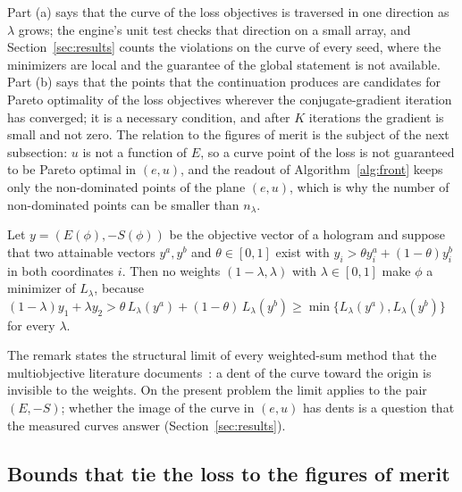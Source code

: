 Part (a) says that the curve of the loss objectives is traversed in one direction as $\lambda$ grows; the engine's unit test checks that direction on a small array, and Section~\ref{sec:results} counts the violations on the curve of every seed, where the minimizers are local and the guarantee of the global statement is not available. Part (b) says that the points that the continuation produces
are candidates for Pareto optimality of the loss objectives wherever the conjugate-gradient iteration has converged; it is a necessary condition, and after $K$ iterations the gradient is small and not zero. The relation to the figures of merit is the subject of the next subsection: $u$ is not a function of $E$, so a curve point of the loss is not guaranteed to be Pareto optimal in $(e,u)$, and the readout of Algorithm~\ref{alg:front}
keeps only the non-dominated points of the plane $(e,u)$, which is why the number of non-dominated points can be smaller than $n_\lambda$.

\begin{remark}\label{rem:convex}
Let $y=(E(\phi),-S(\phi))$ be the objective vector of a hologram and suppose that two attainable vectors $y^{a},y^{b}$ and $\theta\in[0,1]$ exist with $y_i>\theta y^{a}_i+(1-\theta)y^{b}_i$ in both coordinates $i$. Then no weights $(1-\lambda,\lambda)$ with $\lambda\in[0,1]$ make $\phi$ a minimizer of $L_\lambda$,
because $(1-\lambda)y_1+\lambda y_2>\theta\,L_\lambda(y^{a})+(1-\theta)\,L_\lambda(y^{b})\ge\min\{L_\lambda(y^{a}),L_\lambda(y^{b})\}$ for every $\lambda$.
\end{remark}
The remark states the structural limit of every weighted-sum method that the multiobjective literature documents~\cite{das1997,miettinen}: a dent of the curve toward the origin is invisible to the weights. On the present problem the limit applies to the pair $(E,-S)$; whether the image of the curve in $(e,u)$ has dents is a question that the measured curves answer
(Section~\ref{sec:results}).

\subsection{Bounds that tie the loss to the figures of merit}

